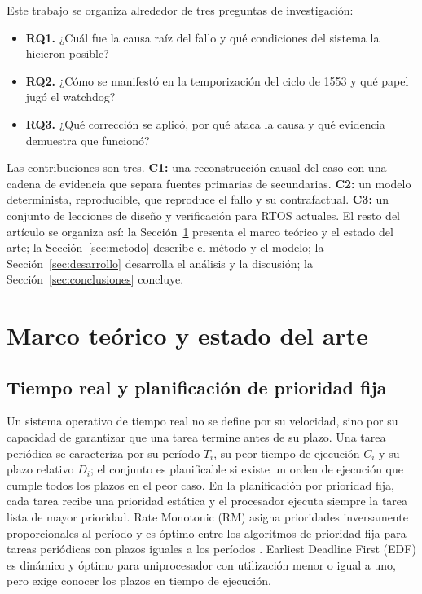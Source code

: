 \documentclass[journal]{IEEEtran}
\begin{document}
Este trabajo se organiza alrededor de tres preguntas de investigación:

\begin{itemize}
  \item \textbf{RQ1.} ¿Cuál fue la causa raíz del fallo y qué condiciones del sistema la hicieron posible?
  \item \textbf{RQ2.} ¿Cómo se manifestó en la temporización del ciclo de 1553 y qué papel jugó el watchdog?
  \item \textbf{RQ3.} ¿Qué corrección se aplicó, por qué ataca la causa y qué evidencia demuestra que funcionó?
\end{itemize}

Las contribuciones son tres. \textbf{C1:} una reconstrucción causal del caso con una cadena de evidencia que separa fuentes primarias de secundarias. \textbf{C2:} un modelo determinista, reproducible, que reproduce el fallo y su contrafactual. \textbf{C3:} un conjunto de lecciones de diseño y verificación para RTOS actuales. El resto del artículo se organiza así: la Sección~\ref{sec:marco} presenta el marco teórico y el estado del arte; la Sección~\ref{sec:metodo} describe el método y el modelo; la Sección~\ref{sec:desarrollo} desarrolla el análisis y la discusión; la Sección~\ref{sec:conclusiones} concluye.

\section{Marco teórico y estado del arte}
\label{sec:marco}

\subsection{Tiempo real y planificación de prioridad fija}

Un sistema operativo de tiempo real no se define por su velocidad, sino por su capacidad de garantizar que una tarea termine antes de su plazo. Una tarea periódica se caracteriza por su período $T_i$, su peor tiempo de ejecución $C_i$ y su plazo relativo $D_i$; el conjunto es planificable si existe un orden de ejecución que cumple todos los plazos en el peor caso. En la planificación por prioridad fija, cada tarea recibe una prioridad estática y el procesador ejecuta siempre la tarea lista de mayor prioridad. Rate Monotonic (RM) asigna prioridades inversamente proporcionales al período y es óptimo entre los algoritmos de prioridad fija para tareas periódicas con plazos iguales a los períodos \cite{liu1973scheduling}. Earliest Deadline First (EDF) es dinámico y óptimo para uniprocesador con utilización menor o igual a uno, pero exige conocer los plazos en tiempo de ejecución.
\end{document}
